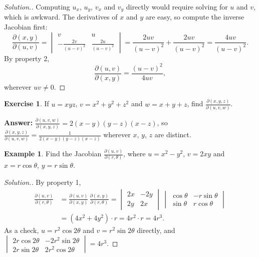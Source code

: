 \documentclass[11pt,a4paper]{article}
\theoremstyle{definition}
\newtheorem{exa}[thm]{Example}
\newtheorem{exe}[thm]{Exercise}
\newenvironment{solution}
  {\renewcommand{\qedsymbol}{}\begin{proof}[\textit{Solution}.]}
  {\end{proof}}
\begin{document}
\begin{solution}
Computing $u_x$, $u_y$, $v_x$ and $v_y$ directly would require solving for $u$
and $v$, which is awkward. The derivatives of $x$ and $y$ are easy, so compute
the inverse Jacobian first:
\[\frac{\partial (x,y)}{\partial(u,v)} =
\begin{vmatrix}
v & u\\[1ex]
-\frac{2v}{(u-v)^2} & \frac{2u}{(u-v)^2}
\end{vmatrix} = \frac{2uv}{(u-v)^2} + \frac{2uv}{(u-v)^2} = \frac{4uv}{(u -v)^2}.\]
By property 2,
\[\frac{\partial (u,v)}{\partial(x,y)} = \frac{(u -v)^2}{4uv},\]
wherever $uv\neq 0$.
\end{solution}

\begin{exe}
\label{exe:jacxyz}
If $u = xyz$, $v = x^2 + y^2 + z^2$ and $w = x+y+z$, find
$\frac{\partial (x,y,z)}{\partial(u,v,w)}$.

\textbf{Answer:} $\frac{\partial(u,v,w)}{\partial(x,y,z)} =
2(x-y)(y-z)(x-z)$, so
$\frac{\partial (x,y,z)}{\partial(u,v,w)} = \frac{1}{2(x-y)(y-z)(x-z)}$ wherever
$x$, $y$, $z$ are distinct.
\end{exe}

\begin{exa}
\label{ex:jacpolar}
Find the Jacobian $\frac{\partial (u,v)}{\partial (r,\theta)}$, where
$u = x^2 - y^2$, $v = 2xy$ and $x = r\cos \theta$, $y = r\sin \theta$.
\end{exa}

\begin{solution}
By property 1,
\begin{align*}
\frac{\partial (u,v)}{\partial(r,\theta)} & = \frac{\partial (u,v)}{\partial
(x,y)}\,\frac{\partial(x,y)}{\partial (r,\theta)}
= \begin{vmatrix}
2x & -2y\\
2y & 2x
\end{vmatrix}\,
\begin{vmatrix}
\cos \theta & -r\sin \theta \\
\sin \theta & r\cos \theta
\end{vmatrix}\\[1ex]
& = (4x^2 + 4y^2)\cdot r = 4r^2\cdot r = 4r^3 .
\end{align*}
As a check, $u = r^2\cos 2\theta$ and $v = r^2\sin 2\theta$ directly, and
$\begin{vmatrix} 2r\cos 2\theta & -2r^2\sin 2\theta\\ 2r\sin 2\theta &
2r^2\cos 2\theta\end{vmatrix} = 4r^3$.
\end{solution}
\end{document}
